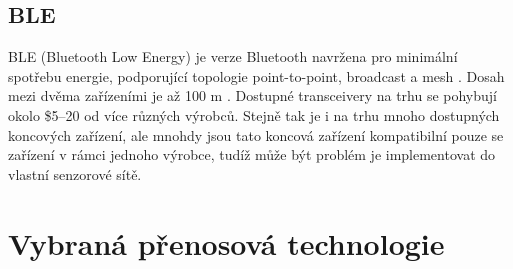 \subsection{BLE}
BLE (Bluetooth Low Energy) je verze Bluetooth navržena pro minimální spotřebu energie, podporující topologie point-to-point, broadcast a mesh \cite{BT_alliance}.
Dosah mezi dvěma zařízeními je až 100 m \cite{BT_nordic}.
Dostupné transceivery na trhu se pohybují okolo \$5–20 od více různých výrobců. Stejně tak je i na trhu mnoho dostupných koncových zařízení, ale mnohdy jsou tato koncová zařízení kompatibilní pouze se zařízení v rámci jednoho výrobce, tudíž může být problém je implementovat do vlastní senzorové sítě. 






\newpage

\section{Vybraná přenosová technologie}

